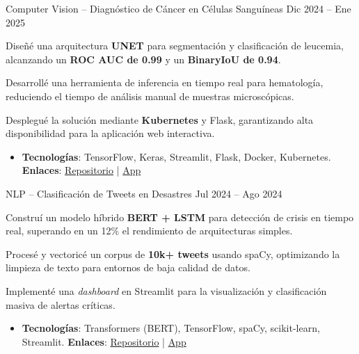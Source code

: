 \begin{cventries}
  \cventrynew
    {}
    {Computer Vision – Diagnóstico de Cáncer en Células Sanguíneas}
    {}
    {Dic 2024 – Ene 2025}
    {
      \begin{cvitems}
        \item Diseñé una arquitectura \textbf{UNET} para segmentación y clasificación de leucemia, alcanzando un \textbf{ROC AUC de 0.99} y un \textbf{BinaryIoU de 0.94}.
        \item Desarrollé una herramienta de inferencia en tiempo real para hematología, reduciendo el tiempo de análisis manual de muestras microscópicas.
        \item Desplegué la solución mediante \textbf{Kubernetes} y Flask, garantizando alta disponibilidad para la aplicación web interactiva.
      \end{cvitems}
      \vspace{14pt}
      \begin{itemize}[leftmargin=*]
        \small
        \item[] \textbf{Tecnologías}: TensorFlow, Keras, Streamlit, Flask, Docker, Kubernetes.
        \hspace{1em}
        \textbf{Enlaces}: \href{https://github.com/aletbm/Blood_Cell_Cancer_Prediction}{Repositorio} | \href{https://bloodcellcancerprediction.streamlit.app}{App}
      \end{itemize}
    }

  \cventrynew
    {}
    {NLP – Clasificación de Tweets en Desastres}
    {}
    {Jul 2024 – Ago 2024}
    {
      \begin{cvitems}
        \item Construí un modelo híbrido \textbf{BERT + LSTM} para detección de crisis en tiempo real, superando en un 12\% el rendimiento de arquitecturas simples.
        \item Procesé y vectoricé un corpus de \textbf{10k+ tweets} usando spaCy, optimizando la limpieza de texto para entornos de baja calidad de datos.
        \item Implementé una \textit{dashboard} en Streamlit para la visualización y clasificación masiva de alertas críticas.
      \end{cvitems}
      \vspace{14pt}
      \begin{itemize}[leftmargin=*]
        \small
        \item[] \textbf{Tecnologías}: Transformers (BERT), TensorFlow, spaCy, scikit-learn, Streamlit.
        \hspace{1em}
        \textbf{Enlaces}: \href{https://github.com/aletbm/NLP_with_Disaster_Tweets}{Repositorio} | \href{https://disastertweetsclassification.streamlit.app}{App}
      \end{itemize}
    }
\end{cventries}
